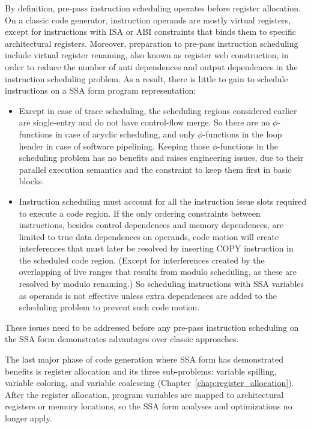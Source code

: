By definition, pre-pass instruction scheduling operates before register
allocation. On a classic code generator, instruction operands are mostly virtual
registers, except for instructions with ISA or ABI constraints that binds them
to specific architectural registers. Moreover, preparation to pre-pass
instruction scheduling include virtual register renaming, also known as register
web construction, in order to reduce the number of anti dependences and output
dependences in the instruction scheduling problem. As a result, there is little
to gain to schedule instructions on a SSA form program representation:
\begin{itemize}

\item Except in case of trace scheduling, the scheduling regions considered
earlier are single-entry and do not have control-flow merge. So there are no
$\phi$-functions in case of acyclic scheduling, and only $\phi$-functions in the
loop header in case of software pipelining. Keeping those $\phi$-functions in
the scheduling problem has no benefits and raises engineering issues, due to
their parallel execution semantics and the constraint to keep them first in
basic blocks.

\item Instruction scheduling must account for all the instruction issue slots
required to execute a code region. If the only ordering constraints between
instructions, besides control dependences and memory dependences, are limited to
true data dependences on operands, code motion will create interferences that
must later be resolved by inserting COPY instruction in the scheduled code
region. (Except for interferences created by the overlapping of live ranges
that results from modulo scheduling, as these are resolved by modulo renaming.)
So scheduling instructions with SSA variables as operands is not effective
unless extra dependences are added to the scheduling problem to prevent such
code motion. 

\end{itemize} These issues need to be addressed before any pre-pass instruction
scheduling on the SSA form demonstrates advantages over classic approaches.
\medskip

The last major phase of code generation where SSA form has demonstrated benefits
is register allocation and its three sub-problems: variable spilling, variable
coloring, and variable coalescing (Chapter~\ref{chap:register_allocation}). After
the register allocation, program variables are mapped to architectural registers
or memory locations, so the SSA form analyses and optimizations no longer apply.

